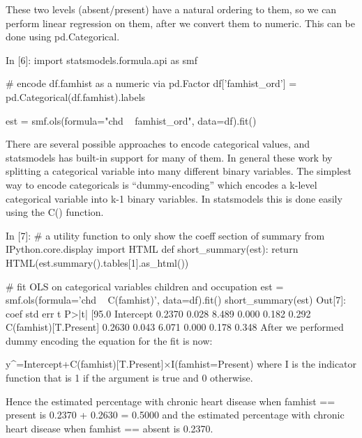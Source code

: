 \begin{frame}[fragile]
	\Large
These two levels (absent/present) have a natural ordering to them, so we can perform linear regression on them, after we convert them to numeric. This can be done using pd.Categorical.
\end{frame}

\begin{frame}[fragile]
	\Large
In [6]:
import statsmodels.formula.api as smf

# encode df.famhist as a numeric via pd.Factor
df['famhist_ord'] = pd.Categorical(df.famhist).labels

est = smf.ols(formula="chd ~ famhist_ord", data=df).fit()
\end{frame}

\begin{frame}[fragile]
	\Large
	There are several possible approaches to encode categorical values, and statsmodels has built-in support for many of them. In general these work by splitting a categorical variable into many different binary variables. The simplest way to encode categoricals is “dummy-encoding” which encodes a k-level categorical variable into k-1 binary variables. In statsmodels this is done easily using the C() function.
\end{frame}

\begin{frame}[fragile]
	\Large
In [7]:
# a utility function to only show the coeff section of summary
from IPython.core.display import HTML
def short_summary(est):
    return HTML(est.summary().tables[1].as_html())

# fit OLS on categorical variables children and occupation
est = smf.ols(formula='chd ~ C(famhist)', data=df).fit()
short_summary(est)
Out[7]:
coef	std err	t	P>|t|	[95.0%
Intercept	0.2370	0.028	8.489	0.000	0.182 0.292
C(famhist)[T.Present]	0.2630	0.043	6.071	0.000	0.178 0.348
After we performed dummy encoding the equation for the fit is now:

y^=Intercept+C(famhist)[T.Present]×I(famhist=Present)
where I is the indicator function that is 1 if the argument is true and 0 otherwise.
\end{frame}

\begin{frame}[fragile]
	\Large
Hence the estimated percentage with chronic heart disease when famhist == present is 0.2370 + 0.2630 = 0.5000 and the estimated percentage with chronic heart disease when famhist == absent is 0.2370.
\end{frame}


